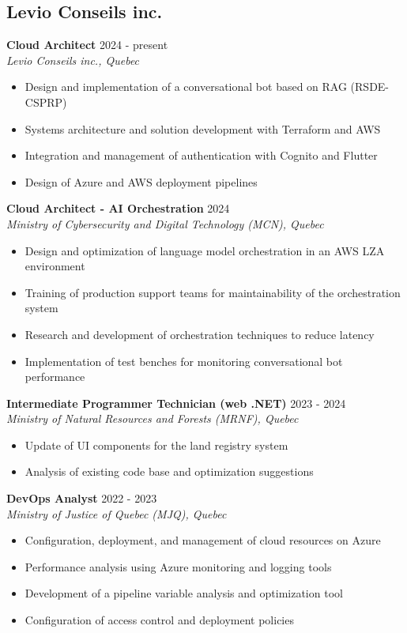 ﻿\documentclass[11pt,letterpaper]{article}
\begin{document}
\subsection*{Levio Conseils inc.}

\textbf{Cloud Architect} \hfill 2024 - present\\
\textit{Levio Conseils inc., Quebec}
\begin{itemize}
\item Design and implementation of a conversational bot based on RAG (RSDE-CSPRP)
\item Systems architecture and solution development with Terraform and AWS
\item Integration and management of authentication with Cognito and Flutter
\item Design of Azure and AWS deployment pipelines
\end{itemize}

\textbf{Cloud Architect - AI Orchestration} \hfill 2024\\
\textit{Ministry of Cybersecurity and Digital Technology (MCN), Quebec}
\begin{itemize}
\item Design and optimization of language model orchestration in an AWS LZA environment
\item Training of production support teams for maintainability of the orchestration system
\item Research and development of orchestration techniques to reduce latency
\item Implementation of test benches for monitoring conversational bot performance
\end{itemize}

\textbf{Intermediate Programmer Technician (web .NET)} \hfill 2023 - 2024\\
\textit{Ministry of Natural Resources and Forests (MRNF), Quebec}
\begin{itemize}
\item Update of UI components for the land registry system
\item Analysis of existing code base and optimization suggestions
\end{itemize}

\textbf{DevOps Analyst} \hfill 2022 - 2023\\
\textit{Ministry of Justice of Quebec (MJQ), Quebec}
\begin{itemize}
\item Configuration, deployment, and management of cloud resources on Azure
\item Performance analysis using Azure monitoring and logging tools
\item Development of a pipeline variable analysis and optimization tool
\item Configuration of access control and deployment policies
\end{itemize}
\end{document}

